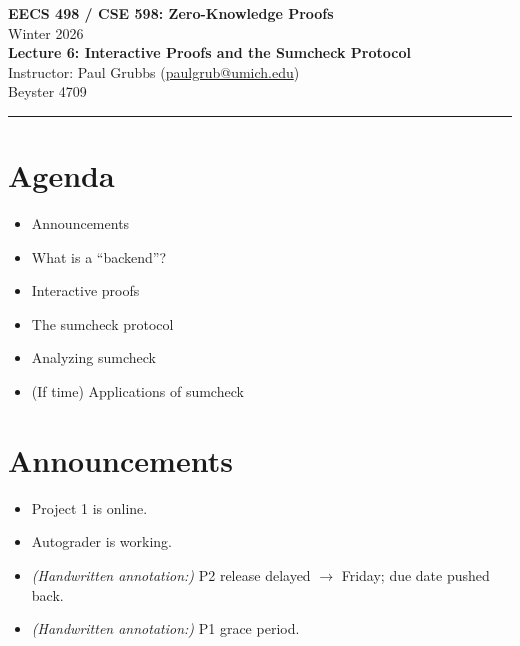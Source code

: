 \documentclass[11pt]{article}
\theoremstyle{plain}
\theoremstyle{definition}
\begin{document}
\begin{center}
  {\LARGE \textbf{EECS 498 / CSE 598: Zero-Knowledge Proofs}}\\[6pt]
  {\large Winter 2026}\\[4pt]
  {\large \textbf{Lecture 6: Interactive Proofs and the Sumcheck Protocol}}\\[4pt]
  {\large Instructor: Paul Grubbs \quad (\href{mailto:paulgrub@umich.edu}{paulgrub@umich.edu})}\\[2pt]
  {\normalsize Beyster 4709}
\end{center}

\vspace{0.5em}
\hrule
\vspace{1em}

\section*{Agenda}
\begin{itemize}
  \item Announcements
  \item What is a ``backend''?
  \item Interactive proofs
  \item The sumcheck protocol
  \item Analyzing sumcheck
  \item (If time) Applications of sumcheck
\end{itemize}

\newpage

\section{Announcements}

\begin{itemize}
  \item Project 1 is online.
  \item Autograder is working.
  \item \textit{(Handwritten annotation:)} P2 release delayed $\to$ Friday; due date pushed back.
  \item \textit{(Handwritten annotation:)} P1 grace period.
\end{itemize}
\end{document}
